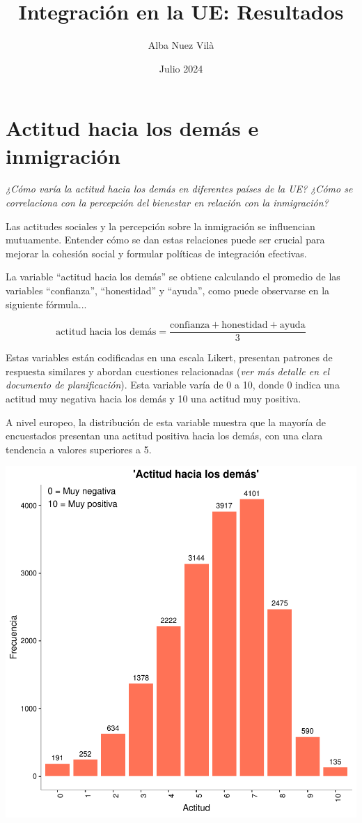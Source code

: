 \documentclass{article}
\title{Integración en la UE: Resultados}
\author{Alba Nuez Vilà}
\date{Julio 2024}
\begin{document}

\maketitle

\section{Actitud hacia los demás e inmigración}

\begin{center}
\emph{¿Cómo varía la actitud hacia los demás en diferentes países de la UE? ¿Cómo se correlaciona con la percepción del bienestar en relación con la inmigración?}
\end{center}

Las actitudes sociales y la percepción sobre la inmigración se influencian mutuamente. Entender cómo se dan estas relaciones puede ser crucial para mejorar la cohesión social y formular políticas de integración efectivas.

La variable ``actitud hacia los demás'' se obtiene calculando el promedio de las variables ``confianza'', ``honestidad'' y ``ayuda'', como puede observarse en la siguiente fórmula...

\[
\text{actitud hacia los demás} = \frac{\text{confianza} + \text{honestidad} + \text{ayuda}}{3}
\]

Estas variables están codificadas en una escala Likert, presentan patrones de respuesta similares y abordan cuestiones relacionadas (\textit{ver más detalle en el documento de planificación}). Esta variable varía de 0 a 10, donde 0 indica una actitud muy negativa hacia los demás y 10 una actitud muy positiva. 

A nivel europeo, la distribución de esta variable muestra que la mayoría de encuestados presentan una actitud positiva hacia los demás, con una clara tendencia a valores superiores a 5.

\includegraphics{Informe_resultados-histogram}
\end{document}
